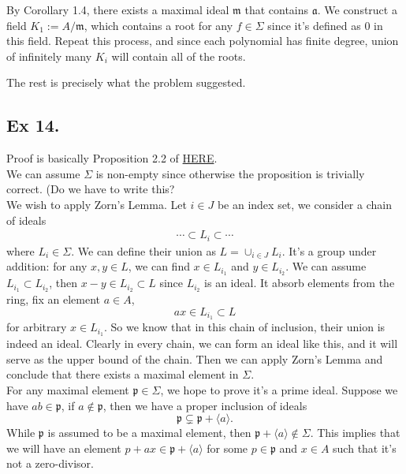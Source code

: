 By Corollary 1.4, there exists a maximal ideal $\mathfrak m$ that contains $\mathfrak a$. We construct a field $K_1:=A/\mathfrak m$, which contains a root for any $f\in \Sigma$ since it's defined as $0$ in this field. Repeat this process, and since each polynomial has finite degree, union of infinitely many $K_i$ will contain all of the roots. 

The rest is precisely what the problem suggested.

\subsection{Ex 14.}

Proof is basically Proposition 2.2 of \href{https://www.jmilne.org/math/xnotes/CA.pdf}{HERE}.\\

We can assume $\Sigma$ is non-empty since otherwise the proposition is trivially correct.  (Do we have to write this?\\

We wish to apply Zorn's Lemma. Let $i\in J$ be an index set, we consider a chain of ideals
\begin{align*}
    \cdots\subset L_i\subset \cdots
\end{align*}where $L_i\in \Sigma$. We can define their union as $L=\cup_{i\in J} L_i$. 
It's a group under addition: for any $x,y\in L$, we can find $x\in L_{i_1}$ and $y\in L_{i_2}$. We can assume $L_{i_1}\subset L_{i_2}$, then $x-y\in L_{i_2}\subset L$ since $L_{i_2}$ is an ideal. It absorb elements from the ring, fix an element $a\in A$, 
$$ax\in L_{i_1}\subset L$$ for arbitrary $x\in L_{i_1}$. So we know that in this chain of inclusion, their union is indeed an ideal. Clearly in every chain, we can form an ideal like this, and it will serve as the upper bound of the chain. Then we can apply Zorn's Lemma and conclude that there exists a maximal element in $\Sigma$.\\

For any maximal element $\mathfrak p\in \Sigma$, we hope to prove it's a prime ideal.
Suppose we have $ab\in \mathfrak p$, if $a\notin \mathfrak p$, then we have a proper inclusion of ideals 
$$\mathfrak p\subsetneq \mathfrak p+\langle a\rangle.$$ While $\mathfrak p$ is assumed to be a maximal element, then $\mathfrak p+\langle a\rangle\notin \Sigma$. This implies that we will have an element $p+ax\in \mathfrak p+\langle a\rangle$ for some $p\in \mathfrak p$ and $x\in A$ such that it's not a zero-divisor. \\

